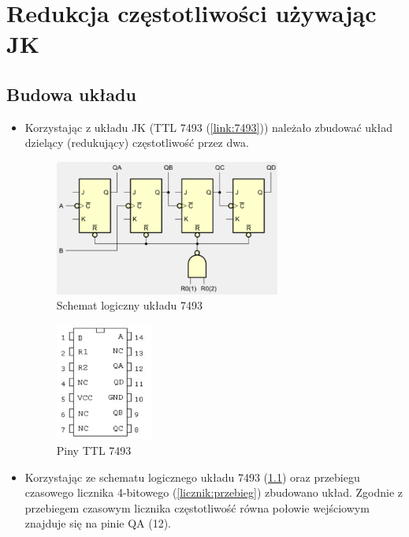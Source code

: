 \chapter{Redukcja częstotliwości używając JK}

\section{Budowa układu}

\begin{itemize}
    \item Korzystając z układu JK (TTL 7493 (\ref{link:7493})) należało zbudować układ dzielący (redukujący) częstotliwość przez dwa.
        \begin{figure}[H]
            \centering
            \includegraphics[width=0.7\textwidth]{img/schemes/logic_scheme_7943.png}
            \caption{Schemat logiczny układu 7493}
            \label{JK_dzielenie:schemat_logiczny}
        \end{figure}
        \begin{figure}[H]
            \centering
            \includegraphics[width=0.3\textwidth]{img/schemes/7493_pins.png}
            \caption{Piny TTL 7493}
            \label{JK_dzielenie:piny}
        \end{figure}
    \item Korzystając ze schematu logicznego układu 7493 (\ref{JK_dzielenie:schemat_logiczny}) oraz przebiegu czasowego licznika 4-bitowego (\ref{licznik:przebieg}) zbudowano układ. Zgodnie z przebiegem czasowym licznika częstotliwość równa połowie wejściowym znajduje się na pinie QA (12).

\end{itemize}
